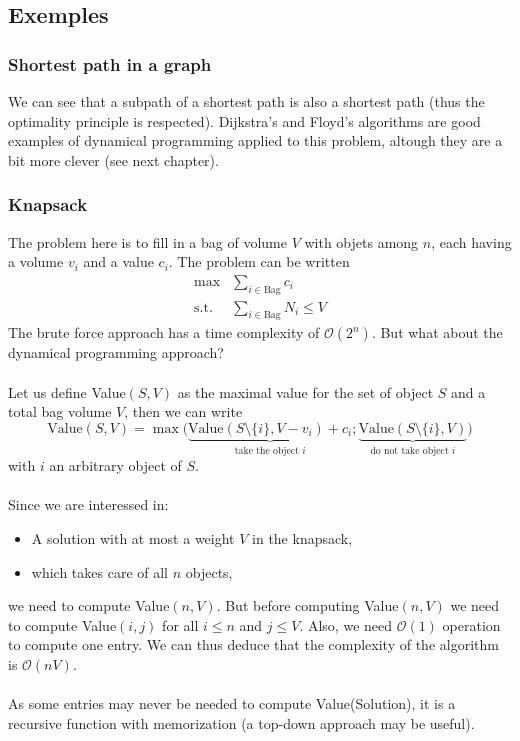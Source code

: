 \subsection{Exemples}

\subsubsection*{Shortest path in a graph}

We can see that a subpath of a shortest path is also a shortest path (thus the optimality principle is respected). Dijkstra's and Floyd's algorithms are good examples of dynamical programming applied to this problem, altough they are a bit more clever (see next chapter).

\subsubsection*{Knapsack}

The problem here is to fill in a bag of volume $V$ with objets among $n$, each having a volume $v_i$ and a value $c_i$. The problem can be written
\begin{align*}
\max & \sum_{i \in \text{Bag}} c_i  \\
\text{s.t.} & \sum_{i \in \text{Bag}} N_i \leq V
\end{align*}
The brute force approach has a time complexity of $\mathcal{O}(2^n)$. But what about the dynamical programming approach?
\\ \\
Let us define Value$(S,V)$ as the maximal value for the set of object $S$ and a total bag volume $V$, then we can write
\[
\text{Value}(S,V) = \max \big(\underbrace{\text{Value}(S \setminus \{i\}, V-v_i)+c_i}_{\text{take the object }i} ; \underbrace{\text{Value}(S \setminus \{i\},V)}_{\text{do not take object }i}\big)
\]
with $i$ an arbitrary object of $S$.
\\ \\
Since we are interessed in:
\begin{itemize}
\item A solution with at most a weight $V$ in the knapsack,
\item which takes care of all $n$ objects,
\end{itemize}
we need to compute Value$(n,V)$. But before computing Value$(n,V)$ we need to compute Value$(i,j)$ for all $i \leq n$ and $j \leq V$. Also, we need $\mathcal{O}(1)$ operation to compute one entry. We can thus deduce that the complexity of the algorithm is $\mathcal{O}(nV)$.
\\ \\
As some entries may never be needed to compute Value(Solution), it is a recursive function with memorization (a top-down approach may be useful).

